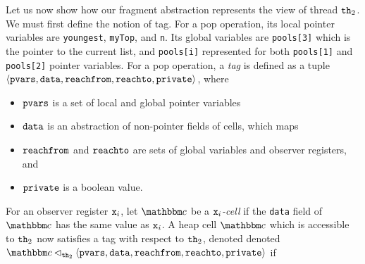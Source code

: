 Let us now show how our fragment abstraction represents the view of thread
${\tt th}_2$.
We must first define the notion of tag.
For a pop operation, its local pointer variables are 
{\tt youngest}, {\tt myTop}, and {\tt n}. Its global variables are {\tt pools[3]} which is the pointer to the current list, and {\tt pools[i]} represented for both {\tt pools[1]} and {\tt pools[2]} pointer variables.
For a pop operation, a {\em tag} is defined as a tuple
$\left\langle\mathtt{pvars},\mathtt{data},\mathtt{reachfrom},\mathtt{reachto},\mathtt{private}\right\rangle$, where
\begin{itemize}
\item
  $\mathtt{pvars}$ is a set of local and global pointer variables
\item
  $\mathtt{data}$ is an abstraction of non-pointer fields of cells, which maps
\item
  $\mathtt{reachfrom}$ and $\mathtt{reachto}$ are sets of global variables and observer registers, and %
\item
  $\mathtt{private}$ is a boolean value.
\end{itemize}
For an observer register $\mathtt{x}_i$, let $\cell$ be a {\em $\mathtt{x}_i$-cell} if
the {\tt data} field of $\cell$ has the same value as $\mathtt{x}_i$.
A heap cell $\cell$ which is accessible to ${\tt th}_2$ now satisfies a tag
with respect to ${\tt th}_2$, denoted
denoted $\cell \satfrag{{\thread_2}} \tagtuple$ if
